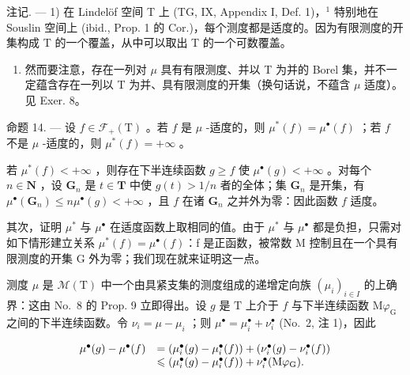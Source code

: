 注记. --- 1) 在 Lindelöf 空间 T 上 (TG, IX, Appendix I, Def. 1)，\(^{1}\) 特别地在 Souslin 空间上 (ibid., Prop. 1 的 Cor.)，每个测度都是适度的。因为有限测度的开集构成 T 的一个覆盖，从中可以取出 T 的一个可数覆盖。

\begin{enumerate}
\def\labelenumi{\arabic{enumi})}
\setcounter{enumi}{1}
\tightlist
\item
  然而要注意，存在一列对 \(\mu\) 具有有限测度、并以 T 为并的 Borel 集，并不一定蕴含存在一列以 T 为并、具有限测度的开集（换句话说，不蕴含 \(\mu\) 适度）。见 Exer. 8。
\end{enumerate}

命题 14. --- 设 \(f \in \mathcal{F}_{+}(\mathrm{T})\) 。若 \(f\) 是 \(\mu\) -适度的，则 \(\mu^{*}(f) = \mu^{\bullet}(f)\) ；若 \(f\) 不是 \(\mu\) -适度的，则 \(\mu^{*}(f) = +\infty\) 。

若 \(\mu^{*}(f) < +\infty\) ，则存在下半连续函数 \(g \geqslant f\) 使 \(\mu^{\bullet}(g) < +\infty\) 。对每个 \(n \in \mathbf{N}\) ，设 \(\mathbf{G}_{n}\) 是 \(t \in \mathbf{T}\) 中使 \(g(t) > 1/n\) 者的全体；集 \(\mathbf{G}_{n}\) 是开集，有 \(\mu^{\bullet}(\mathbf{G}_{n}) \leqslant n\mu^{\bullet}(g) < +\infty\) ，且 \(f\) 在诸 \(\mathbf{G}_{n}\) 之并外为零：因此函数 \(f\) 适度。

其次，证明 \(\mu^{*}\) 与 \(\mu^{\bullet}\) 在适度函数上取相同的值。由于 \(\mu^{*}\) 与 \(\mu^{\bullet}\) 都是负担，只需对如下情形建立关系 \(\mu^{*}(f)=\mu^{\bullet}(f)\)：f 是正函数，被常数 M 控制且在一个具有限测度的开集 G 外为零；我们现在就来证明这一点。

测度 \(\mu\) 是 \(\mathcal{M}(\mathrm{T})\) 中一个由具紧支集的测度组成的递增定向族 \((\mu_i)_{i\in I}\) 的上确界：这由 No.~8 的 Prop. 9 立即得出。设 \(g\) 是 \(\mathrm{T}\) 上介于 \(f\) 与下半连续函数 \(\mathrm{M}\varphi_{\mathrm{G}}\) 之间的下半连续函数。令 \(\nu_i = \mu - \mu_i\) ；则 \(\mu^{\bullet} = \mu_i^{\bullet} + \nu_i^{\bullet}\) (No.~2, 注 1)，因此

\[
\begin{array}{r l} \mu^ {\bullet} (g) - \mu^ {\bullet} (f) & = (\mu_ {i} ^ {\bullet} (g) - \mu_ {i} ^ {\bullet} (f)) + (\nu_ {i} ^ {\bullet} (g) - \nu_ {i} ^ {\bullet} (f)) \\ & \leqslant (\mu_ {i} ^ {\bullet} (g) - \mu_ {i} ^ {\bullet} (f)) + \nu_ {i} ^ {\bullet} (\mathrm{M} \varphi_ {\mathrm{G}}). \end{array}
\]

